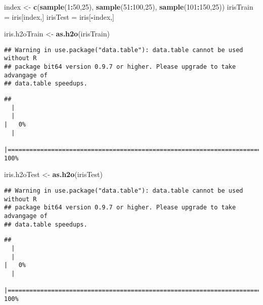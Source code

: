 \documentclass[
]{book}
\newenvironment{Shaded}{\begin{snugshade}}{\end{snugshade}}
\newcommand{\DecValTok}[1]{\textcolor[rgb]{0.00,0.00,0.81}{#1}}
\newcommand{\KeywordTok}[1]{\textcolor[rgb]{0.13,0.29,0.53}{\textbf{#1}}}
\newcommand{\NormalTok}[1]{#1}
\newcommand{\OperatorTok}[1]{\textcolor[rgb]{0.81,0.36,0.00}{\textbf{#1}}}
\newcommand{\StringTok}[1]{\textcolor[rgb]{0.31,0.60,0.02}{#1}}
\begin{document}
\begin{Shaded}
\begin{Highlighting}[]
\NormalTok{index <-}\StringTok{ }\KeywordTok{c}\NormalTok{(}\KeywordTok{sample}\NormalTok{(}\DecValTok{1}\OperatorTok{:}\DecValTok{50}\NormalTok{,}\DecValTok{25}\NormalTok{), }\KeywordTok{sample}\NormalTok{(}\DecValTok{51}\OperatorTok{:}\DecValTok{100}\NormalTok{,}\DecValTok{25}\NormalTok{), }\KeywordTok{sample}\NormalTok{(}\DecValTok{101}\OperatorTok{:}\DecValTok{150}\NormalTok{,}\DecValTok{25}\NormalTok{))}
\NormalTok{irisTrain =}\StringTok{ }\NormalTok{iris[index,]}
\NormalTok{irisTest =}\StringTok{ }\NormalTok{iris[}\OperatorTok{-}\NormalTok{index,]}

\NormalTok{iris.h2oTrain <-}\StringTok{ }\KeywordTok{as.h2o}\NormalTok{(irisTrain)}
\end{Highlighting}
\end{Shaded}

\begin{verbatim}
## Warning in use.package("data.table"): data.table cannot be used without R
## package bit64 version 0.9.7 or higher. Please upgrade to take advangage of
## data.table speedups.
\end{verbatim}

\begin{verbatim}
## 
  |                                                                            
  |                                                                      |   0%
  |                                                                            
  |======================================================================| 100%
\end{verbatim}

\begin{Shaded}
\begin{Highlighting}[]
\NormalTok{iris.h2oTest <-}\StringTok{ }\KeywordTok{as.h2o}\NormalTok{(irisTest)}
\end{Highlighting}
\end{Shaded}

\begin{verbatim}
## Warning in use.package("data.table"): data.table cannot be used without R
## package bit64 version 0.9.7 or higher. Please upgrade to take advangage of
## data.table speedups.
\end{verbatim}

\begin{verbatim}
## 
  |                                                                            
  |                                                                      |   0%
  |                                                                            
  |======================================================================| 100%
\end{verbatim}
\end{document}
